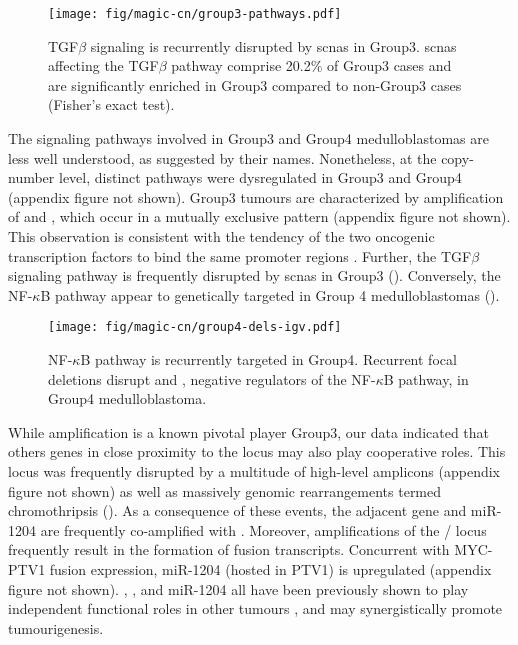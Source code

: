 \begin{SCfigure}[5][b]
	\centering
	\texttt{[image: fig/magic-cn/group3-pathways.pdf]}
	\caption[TGF$\beta$ signaling is recurrently disrupted by \gls{scnas} in Group3]
	{
	TGF$\beta$ signaling is recurrently disrupted by \gls{scnas} in Group3.
	\gls{scnas} affecting the TGF$\beta$ pathway comprise 20.2\% of Group3 cases and are significantly enriched in Group3 compared to non-Group3 cases (Fisher's exact test).
	}
	\label{fig:group3-pathways}
\end{SCfigure}

\clearpage

The signaling pathways involved in Group3 and Group4 medulloblastomas are less well understood, as suggested by their names. Nonetheless, at the copy-number level, distinct pathways were dysregulated in Group3 and Group4 (appendix figure not shown). Group3 tumours are characterized by amplification of  and , which occur in a mutually exclusive pattern (appendix figure not shown). This observation is consistent with the tendency of the two oncogenic transcription factors to bind the same promoter regions . Further, the TGF$\beta$ signaling pathway is frequently disrupted by \gls{scnas} in Group3 (). Conversely, the NF-$\kappa$B pathway appear to genetically targeted in Group 4 medulloblastomas ().

\begin{SCfigure}[2]
	\centering
	\texttt{[image: fig/magic-cn/group4-dels-igv.pdf]}
	\caption[NF-$\kappa$B pathway is recurrently targeted in Group4]
	{
	NF-$\kappa$B pathway is recurrently targeted in Group4.
	Recurrent focal deletions disrupt  and , negative regulators of the NF-$\kappa$B pathway, in Group4 medulloblastoma.
	}
	\label{fig:group4-dels-igv}
\end{SCfigure}

While  amplification is a known pivotal player Group3, our data indicated that others genes in close proximity to the  locus may also play cooperative roles. This locus was frequently disrupted by a multitude of high-level amplicons (appendix figure not shown) as well as massively genomic rearrangements termed chromothripsis (). As a consequence of these events, the adjacent  gene and miR-1204 are frequently co-amplified with . Moreover, amplifications of the / locus frequently result in the formation of fusion transcripts. Concurrent with MYC-PTV1 fusion expression, miR-1204 (hosted in PTV1) is upregulated (appendix figure not shown). , , and miR-1204 all have been previously shown to play independent functional roles in other tumours , and may synergistically promote tumourigenesis.

